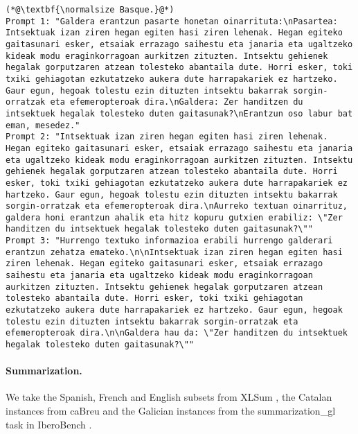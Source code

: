 \begin{lstlisting}[label=lst:judge_readcompr_instances,caption={Example of prompts for reading comprehension in English and Basque.}]
(*@\textbf{\normalsize Basque.}@*)
Prompt 1: "Galdera erantzun pasarte honetan oinarrituta:\nPasartea: Intsektuak izan ziren hegan egiten hasi ziren lehenak. Hegan egiteko gaitasunari esker, etsaiak errazago saihestu eta janaria eta ugaltzeko kideak modu eraginkorragoan aurkitzen zituzten. Intsektu gehienek hegalak gorputzaren atzean tolesteko abantaila dute. Horri esker, toki txiki gehiagotan ezkutatzeko aukera dute harrapakariek ez hartzeko. Gaur egun, hegoak tolestu ezin dituzten intsektu bakarrak sorgin-orratzak eta efemeropteroak dira.\nGaldera: Zer handitzen du intsektuek hegalak tolesteko duten gaitasunak?\nErantzun oso labur bat eman, mesedez."
Prompt 2: "Intsektuak izan ziren hegan egiten hasi ziren lehenak. Hegan egiteko gaitasunari esker, etsaiak errazago saihestu eta janaria eta ugaltzeko kideak modu eraginkorragoan aurkitzen zituzten. Intsektu gehienek hegalak gorputzaren atzean tolesteko abantaila dute. Horri esker, toki txiki gehiagotan ezkutatzeko aukera dute harrapakariek ez hartzeko. Gaur egun, hegoak tolestu ezin dituzten intsektu bakarrak sorgin-orratzak eta efemeropteroak dira.\nAurreko textuan oinarrituz, galdera honi erantzun ahalik eta hitz kopuru gutxien erabiliz: \"Zer handitzen du intsektuek hegalak tolesteko duten gaitasunak?\""
Prompt 3: "Hurrengo textuko informazioa erabili hurrengo galderari erantzun zehatza emateko.\n\nIntsektuak izan ziren hegan egiten hasi ziren lehenak. Hegan egiteko gaitasunari esker, etsaiak errazago saihestu eta janaria eta ugaltzeko kideak modu eraginkorragoan aurkitzen zituzten. Intsektu gehienek hegalak gorputzaren atzean tolesteko abantaila dute. Horri esker, toki txiki gehiagotan ezkutatzeko aukera dute harrapakariek ez hartzeko. Gaur egun, hegoak tolestu ezin dituzten intsektu bakarrak sorgin-orratzak eta efemeropteroak dira.\n\nGaldera hau da: \"Zer handitzen du intsektuek hegalak tolesteko duten gaitasunak?\""
\end{lstlisting}

\paragraph{Summarization.} We take the Spanish, French and English subsets from XLSum \citep{hasan-etal-2021-xl}, the Catalan instances from caBreu \citep{gonzalez-agirre-etal-2024-building-data} and the Galician instances from the summarization\_gl task in IberoBench \citep{iberobench-coling-2025}.

